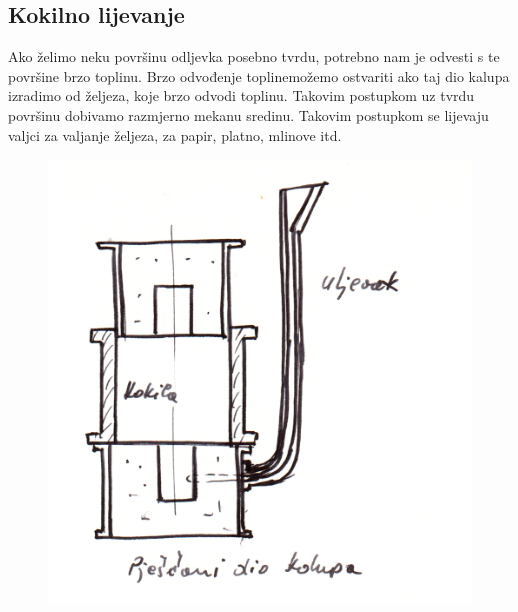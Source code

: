 \documentclass[a4paper,12pt]{article}
\numberwithin{figure}{section}
\begin{document}
\subsection{Kokilno lijevanje}
Ako želimo neku površinu odljevka posebno tvrdu, potrebno nam je odvesti s te površine brzo toplinu. Brzo odvođenje toplinemožemo ostvariti ako taj dio kalupa izradimo od željeza, koje brzo odvodi toplinu. Takovim postupkom uz tvrdu površinu dobivamo razmjerno mekanu sredinu. Takovim postupkom se lijevaju valjci za valjanje željeza, za papir, platno, mlinove itd.
\begin{figure}[!h]
\centering
\includegraphics[scale=0.17]{image_60-1.png}
\end{figure}
\FloatBarrier
\end{document}
